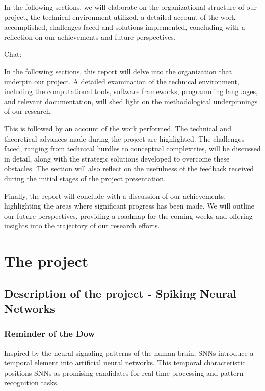 \documentclass[11pt]{article}
\begin{document}
In the following sections, we will elaborate on the organizational structure of our project, the technical environment utilized, a detailed account of the work accomplished, challenges faced and solutions implemented, concluding with a reflection on our achievements and future perspectives.

Chat:

In the following sections, this report will delve into the organization that underpin our project. A detailed examination of the technical environment, including the computational tools, software frameworks, programming languages, and relevant documentation, will shed light on the methodological underpinnings of our research.

This is followed by an account of the work performed. The technical and theoretical advances made during the project are highlighted. The challenges faced, ranging from technical hurdles to conceptual complexities, will be discussed in detail, along with the strategic solutions developed to overcome these obstacles. The section will also reflect on the usefulness of the feedback received during the initial stages of the project presentation.

Finally, the report will conclude with a discussion of our achievements, highlighting the areas where significant progress has been made. We will outline our future perspectives, providing a roadmap for the coming weeks and offering insights into the trajectory of our research efforts.





\pagebreak

\section{The project}

\subsection{Description of the project - Spiking Neural Networks}

\subsubsection{Reminder of the Dow}

Inspired by the neural signaling patterns of the human brain, SNNs introduce a temporal element into artificial neural networks. This temporal characteristic positions SNNs as promising candidates for real-time processing and pattern recognition tasks.
\end{document}
